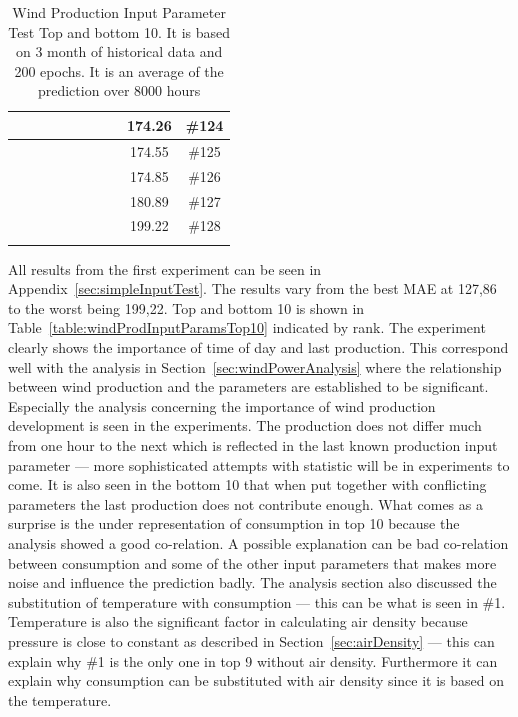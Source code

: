 \begin{center}
\begin{longtable}{|c|c|c|c|c|c|c|c|c|c|}
 \x &  \x &  \x &  \x &  \x &  \x &  \x &  \x & 174.26 & \#124 \\ \hline
 \x &  \x &  &  \x &  &  \x &  \x &  \x & 174.55 & \#125 \\ \hline
 \x &  &  &  \x &  &  \x &  \x &  \x & 174.85 & \#126 \\ \hline
 \x &  \x &  \x &  &  \x &  \x &  \x &  & 180.89 & \#127 \\ \hline
 \x &  \x &  &  &  \x &  \x &  \x &  \x & 199.22 & \#128 \\ \hline
\caption{Wind Production Input Parameter Test Top and bottom 10. It is based on 3 month of historical data and 200 epochs. It is an average of the prediction over 8000 hours}
\end{longtable}
\label{table:windProdInputParamsTop10}
\end{center}
\normalsize

All results from the first experiment can be seen in Appendix~\ref{sec:simpleInputTest}. The results vary from the best MAE at 127,86 to the worst being 199,22. Top and bottom 10 is shown in Table~\ref{table:windProdInputParamsTop10} indicated by rank. The experiment clearly shows the importance of time of day and last production. This correspond well with the analysis in Section~\ref{sec:windPowerAnalysis} where the relationship between wind production and the parameters are established to be significant. Especially the analysis concerning the importance of wind production development is  seen in the experiments. The production does not differ much from one hour to the next which is reflected in the last known production input parameter --- more sophisticated attempts with statistic will be in experiments to come. It is also seen in the bottom 10 that when put together with conflicting parameters the last production does not contribute enough.  What comes as a surprise is the under representation of consumption in top 10 because the analysis showed a good co-relation. A possible explanation can be bad co-relation between consumption and some of the other input parameters that makes more noise and influence the prediction badly. The analysis section also discussed the substitution of temperature with consumption --- this can be what is seen in \#1. Temperature is also the significant factor in calculating air density because pressure is close to constant as described in Section~\ref{sec:airDensity} --- this can explain why \#1 is the only one in top 9 without air density. Furthermore it can explain why consumption can be substituted with air density since it is based on the temperature.

